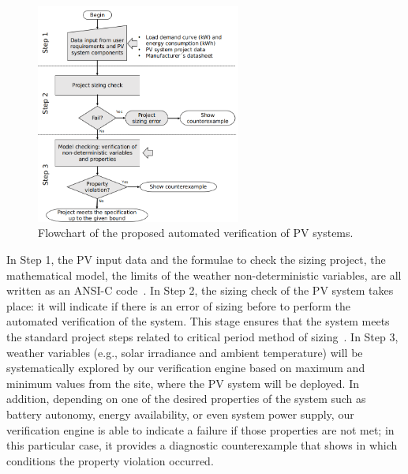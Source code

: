 \documentclass[review]{elsarticle}
\begin{document}
\begin{figure}[h]
\includegraphics[width=0.6\textwidth]{flowchart_verification5.png}
\centering
\caption{Flowchart of the proposed automated verification of PV systems.}
\label{fig:flowchartgeneral}
\end{figure}

In Step 1, the PV input data %
and the formulae to check the sizing project, the mathematical model, the limits of the weather non-deterministic variables, are all written as an ANSI-C code~\citep{ANSI2018}. In Step 2, the sizing check of the PV system takes place: it will indicate if there is an error of sizing before to perform the automated verification of the system. This stage ensures that the system meets the standard project steps related to critical period method of sizing~\citep{Pinho}. 
%
In Step 3, weather variables (e.g., solar irradiance and ambient temperature) will be systematically explored by our verification engine based on maximum and minimum values from the site, where the PV system will be deployed. 
In addition, depending on one of the desired properties of the system such as battery autonomy, energy availability, or even system power supply, our verification engine is able to indicate a failure if those properties are not met; in this particular case, it provides a diagnostic counterexample that shows in which conditions the property violation occurred. 
\end{document}
